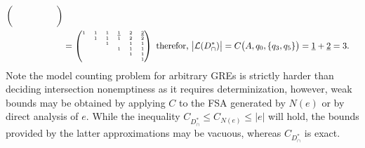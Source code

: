 \documentclass[sigplan,review,acmsmall,nonacm,screen,anonymous]{acmart}\settopmatter{printfolios=false,printccs=false,printacmref=false}
\begin{document}
\begin{align}
\begin{tiny}
\begin{pmatrix}
              &   &   &   &   &   \\
              &   &   &   &   &   \\
              &   &   &   &   &   \\
              &   &   &   &   &   \\
  \end{pmatrix}\end{tiny}\\
  &= \begin{tiny}\begin{pmatrix}
          1   & 1  & 1  & \underline{1} & 2 & \underline{2} \\
              & 1  & 1  & 1 & 2 & 2 \\
              &    & 1  &   & 1 & 1 \\
              &    &    & 1 & 1 & 1 \\
              &    &    &   & 1 & 1 \\
              &    &    &   &   & 1 \\
\end{pmatrix}\end{tiny} \text{ therefor, } \big|\mathcal{L}(D_\cap^*)\big| = C\big(A, q_0, \{q_3, q_5\}\big) = \underline{1} + \underline{2} = 3.
\end{align}
Note the model counting problem for arbitrary GREs is strictly harder than deciding intersection nonemptiness as it requires determinization, however, weak bounds may be obtained by applying $C$ to the FSA generated by $N(e)$ or by direct analysis of $e$. While the inequality $C_{D_\cap^*} \leq C_{N(e)} \leq |e|$ will hold, the bounds provided by the latter approximations may be vacuous, whereas $C_{D_\cap^*}$ is exact.
\end{document}
